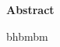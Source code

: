\documentclass[12pt,a4paper]{report}
\begin{document}
	\begin{center}
		{\huge\bf Abstract}\par
	\end{center}
	bhbmbm
\end{document}
